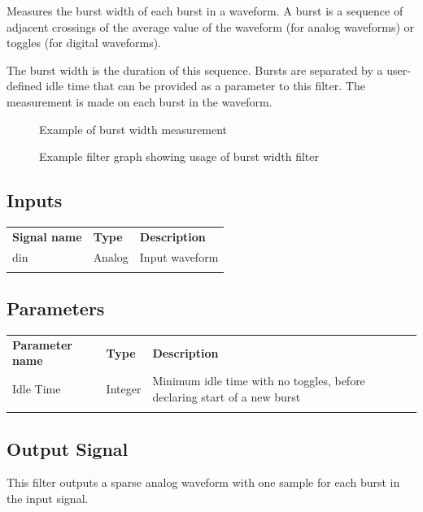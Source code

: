 Measures the burst width of each burst in a waveform. A burst is a sequence of adjacent crossings of the average value
of the waveform (for analog waveforms) or toggles (for digital waveforms).

The burst width is the duration of this sequence. Bursts are separated by a user-defined idle time that can be provided
as a parameter to this filter. The measurement is made on each burst in the waveform.

\begin{figure}[h]
	\centering
	\caption{Example of burst width measurement}
	\label{filter_burstwidth}
	\end{figure}

\begin{figure}[h]
\centering
{}
\caption{Example filter graph showing usage of burst width filter}
\label{filter_graph_base}
\end{figure}
\FloatBarrier

\subsection{Inputs}

\begin{tabularx}{16cm}{llX}
\thickhline
\textbf{Signal name} & \textbf{Type} & \textbf{Description} \\
\thickhline
din & Analog & Input waveform \\
\thickhline
\end{tabularx}

\subsection{Parameters}

\begin{tabularx}{16cm}{llX}
\thickhline
\textbf{Parameter name} & \textbf{Type} & \textbf{Description} \\
\thickhline
Idle Time & Integer & Minimum idle time with no toggles, before declaring start of a new burst\\
\thickhline
\end{tabularx}

\subsection{Output Signal}

This filter outputs a sparse analog waveform with one sample for each burst in the input signal.

